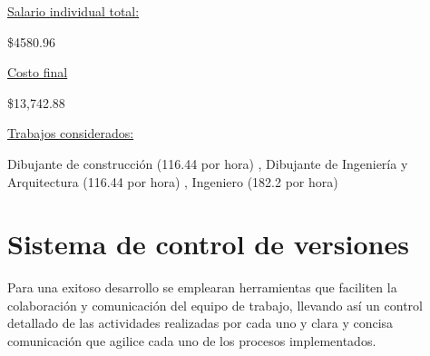\documentclass[12pt]{article} %
\begin{document}
	\newpage
	\underline{Salario individual total:}
	
	\$4580.96
	
	\underline{Costo final}
	
	\$13,742.88
	
	\underline{Trabajos considerados:}
	
	Dibujante de construcción 
	\color{gray}(116.44 por hora)\color{black}
	, Dibujante de Ingeniería y Arquitectura 
	\color{gray}(116.44 por hora)\color{black}
	, Ingeniero 
	\color{gray}(182.2 por hora)\color{black}	
	
	\section{Sistema de control de versiones}
	\setlength{\parindent}{1.0cm}
	Para una exitoso desarrollo se emplearan herramientas que faciliten la colaboración y comunicación del equipo de trabajo, llevando así un control detallado de las actividades realizadas por cada uno y clara y concisa comunicación que agilice cada uno de los procesos implementados.
	\setlength{\parindent}{0.0cm}
	
\end{document}
